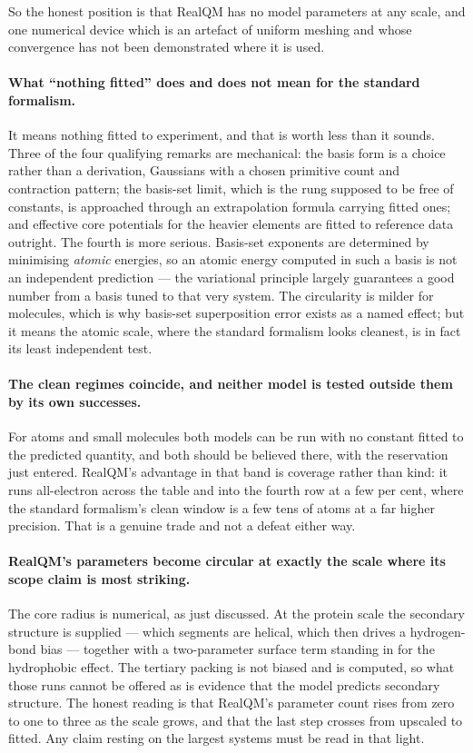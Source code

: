 \documentclass[11pt]{article}
\begin{document}
So the honest position is that RealQM has no model parameters at any scale, and one numerical
device which is an artefact of uniform meshing and whose convergence has not been demonstrated
where it is used.

\paragraph{What ``nothing fitted'' does and does not mean for the standard formalism.} It means
nothing fitted to experiment, and that is worth less than it sounds. Three of the four qualifying
remarks are mechanical: the basis form is a choice rather than a derivation, Gaussians with a
chosen primitive count and contraction pattern; the basis-set limit, which is the rung supposed to
be free of constants, is approached through an extrapolation formula carrying fitted ones; and
effective core potentials for the heavier elements are fitted to reference data outright. The
fourth is more serious. Basis-set exponents are determined by minimising \emph{atomic} energies, so
an atomic energy computed in such a basis is not an independent prediction --- the variational
principle largely guarantees a good number from a basis tuned to that very system. The
circularity is milder for molecules, which is why basis-set superposition error exists as a named
effect; but it means the atomic scale, where the standard formalism looks cleanest, is in fact its
least independent test.

\paragraph{The clean regimes coincide, and neither model is tested outside them by its own
successes.} For atoms and small molecules both models can be run with no constant fitted to the
predicted quantity, and both should be believed there, with the reservation just entered. RealQM's advantage in that band is
coverage rather than kind: it runs all-electron across the table and into the fourth row at a few
per cent, where the standard formalism's clean window is a few tens of atoms at a far higher
precision. That is a genuine trade and not a defeat either way.

\paragraph{RealQM's parameters become circular at exactly the scale where its scope claim is
most striking.} The core radius is numerical, as just discussed. At the protein scale the secondary structure is
supplied --- which segments are helical, which
then drives a hydrogen-bond bias --- together with a two-parameter surface term standing in for
the hydrophobic effect. The tertiary packing is not biased and is computed, so what those runs
cannot be offered as is evidence that the model predicts secondary structure. The honest reading is that RealQM's parameter count rises from zero to one to three as the
scale grows, and that the last step crosses from upscaled to fitted. Any claim resting on the
largest systems must be read in that light.
\end{document}
